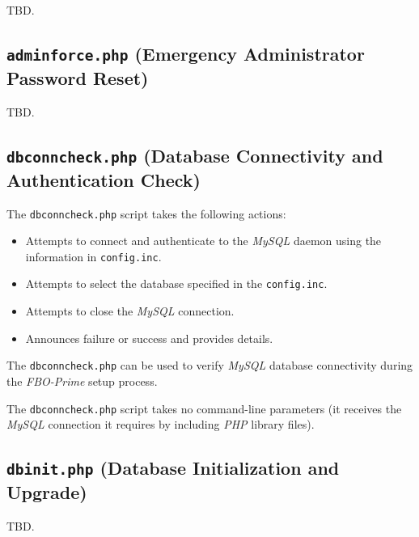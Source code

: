 \documentclass[letterpaper,10pt,titlepage]{article}
\newcommand{\productbasename}{FBO-Prime}
\begin{document}
TBD.


\subsection{\texttt{adminforce.php} (Emergency Administrator Password Reset)}
\label{ssas0:samf0}

TBD.


\subsection{\texttt{dbconncheck.php} (Database Connectivity and Authentication Check)}
\label{ssas0:sdbc0}

The \texttt{dbconncheck.php}
script takes the following actions:

\begin{itemize}
\item Attempts to connect and authenticate to the \emph{MySQL} daemon
      using the information in 
      \texttt{config.inc}.
\item Attempts to select the database specified in the 
      \texttt{config.inc}.
\item Attempts to close the \emph{MySQL} connection.
\item Announces failure or success and provides details.
\end{itemize}

The \texttt{dbconncheck.php} can be used to verify \emph{MySQL} database connectivity
during the \emph{\productbasename{}} setup process.

The \texttt{dbconncheck.php} script takes no command-line parameters (it receives
the \emph{MySQL} connection it requires by including \emph{PHP} library files).



\subsection{\texttt{dbinit.php} (Database Initialization and Upgrade)}
\label{ssas0:sdbi0}

TBD.
\end{document}
